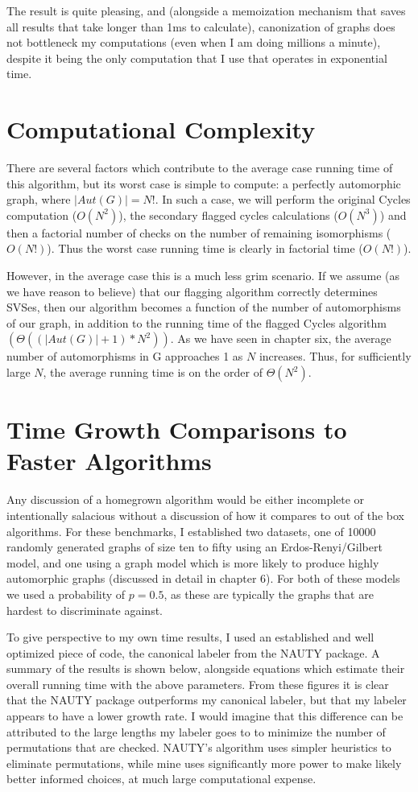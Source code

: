 The result is quite pleasing, and (alongside a memoization mechanism that saves all results that take longer than 1ms to calculate), canonization of graphs does not bottleneck my computations (even when I am doing millions a minute), despite it being the only computation that I use that operates in exponential time.

\section{Computational Complexity}

There are several factors which contribute to the average case running time of this algorithm, but its worst case is simple to compute: a perfectly automorphic graph, where $|Aut(G)| = N!$.
In such a case, we will perform the original Cycles computation ($O(N^2)$), the secondary flagged cycles calculations ($O(N^3)$) and then a factorial number of checks on the number of remaining isomorphisms ($O(N!)$).
Thus the worst case running time is clearly in factorial time ($O(N!)$).

However, in the average case this is a much less grim scenario.
If we assume (as we have reason to believe) that our flagging algorithm correctly determines SVSes, then our algorithm becomes a function of the number of automorphisms of our graph, in addition to the running time of the flagged Cycles algorithm $(\Theta((|Aut(G)| +1) * N^2))$.
As we have seen in chapter six, the average number of automorphisms in G approaches 1 as $N$ increases. Thus, for sufficiently large $N$, the average running time is on the order of $\Theta(N^2)$.

\section{Time Growth Comparisons to Faster Algorithms}
Any discussion of a homegrown algorithm would be either incomplete or intentionally salacious without a discussion of how it compares to out of the box algorithms.
For these benchmarks, I established two datasets, one of 10000 randomly generated graphs of size ten to fifty using an Erdos-Renyi/Gilbert model, and one using a graph model which is more likely to produce highly automorphic graphs (discussed in detail in chapter 6).
For both of these models we used a probability of $p=0.5$, as these are typically the graphs that are hardest to discriminate against.

To give perspective to my own time results, I used an established and well optimized piece of code, the canonical labeler from the NAUTY package.
A summary of the results is shown below, alongside equations which estimate their overall running time with the above parameters.
From these figures it is clear that the NAUTY package outperforms my canonical labeler, but that my labeler appears to have a lower growth rate.
I would imagine that this difference can be attributed to the large lengths my labeler goes to to minimize the number of permutations that are checked.
NAUTY's algorithm uses simpler heuristics to eliminate permutations, while mine uses significantly more power to make likely better informed choices, at much large computational expense.
